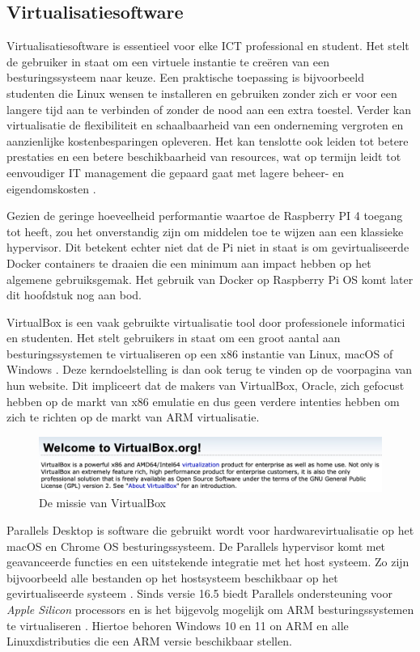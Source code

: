 \subsection{Virtualisatiesoftware}
Virtualisatiesoftware is essentieel voor elke ICT professional en student. Het stelt de gebruiker in staat om een virtuele instantie te creëren van een besturingssysteem naar keuze. Een praktische toepassing is bijvoorbeeld studenten die Linux wensen te installeren en gebruiken zonder zich er voor een langere tijd aan te verbinden of zonder de nood aan een extra toestel. Verder kan virtualisatie de flexibiliteit en schaalbaarheid van een onderneming vergroten en aanzienlijke kostenbesparingen opleveren. Het kan tenslotte ook leiden tot betere prestaties en een betere beschikbaarheid van resources, wat op termijn leidt tot eenvoudiger IT management die gepaard gaat met lagere beheer- en eigendomskosten \autocite{VMware2016}.

Gezien de geringe hoeveelheid performantie waartoe de Raspberry PI 4 toegang tot heeft, zou het onverstandig zijn om middelen toe te wijzen aan een klassieke hypervisor. Dit betekent echter niet dat de Pi niet in staat is om gevirtualiseerde Docker containers te draaien die een minimum aan impact hebben op het algemene gebruiksgemak. Het gebruik van Docker op Raspberry Pi OS komt later dit hoofdstuk nog aan bod.

VirtualBox is een vaak gebruikte virtualisatie tool door professionele informatici en studenten. Het stelt gebruikers in staat om een groot aantal aan besturingssystemen te virtualiseren op een x86 instantie van Linux, macOS of Windows \autocite{VirtualBox2003}. Deze kerndoelstelling is dan ook terug te vinden op de voorpagina van hun website. Dit impliceert dat de makers van VirtualBox, Oracle, zich gefocust hebben op de markt van x86 emulatie en dus geen verdere intenties hebben om zich te richten op de markt van ARM virtualisatie.

\begin{figure}[!h]
	\centering
	\includegraphics[width=\linewidth]{img/virtualbox.png}
	\caption{De missie van VirtualBox \autocite{VirtualBox2003}}
\end{figure}

Parallels Desktop is software die gebruikt wordt voor hardwarevirtualisatie op het macOS en Chrome OS besturingssysteem. De Parallels hypervisor komt met geavanceerde functies en een uitstekende integratie met het host systeem. Zo zijn bijvoorbeeld alle bestanden op het hostsysteem beschikbaar op het gevirtualiseerde systeem \autocite{Parallels2009}. Sinds versie 16.5 biedt Parallels ondersteuning voor \textit{Apple Silicon} processors en is het bijgevolg mogelijk om ARM besturingssystemen te virtualiseren \autocite{Vogel2021}. Hiertoe behoren Windows 10 en 11 on ARM en alle Linuxdistributies die een ARM versie beschikbaar stellen. 

